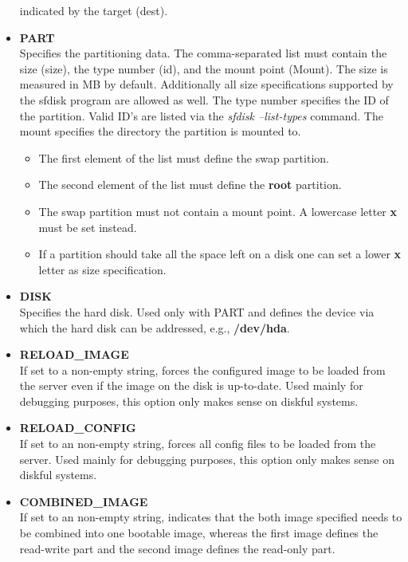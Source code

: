 \begin{itemize}
		indicated by the target (dest).
	\item \textbf{PART}\\
		Specifies the partitioning data. The comma-separated list
		must contain the size (size), the type number (id), and the
		mount point (Mount). The size is measured in MB by default.
		Additionally all size specifications supported by the sfdisk
		program are allowed as well. The type number specifies the ID
		of the partition. Valid ID's are listed via the
		\textit{sfdisk --list-types} command. The mount specifies the
		directory the partition is mounted to.
		\begin{itemize}
			\item The first element of the list must define the swap
                  partition.
            \item The second element of the list must define the
                  \textbf{root} partition.
	        \item The swap partition must not contain a mount point.
                  A lowercase letter \textbf{x} must be set instead.
            \item If a partition should take all the space left on
                  a disk one can set a lower \textbf{x} letter as
                  size specification.
		\end{itemize}
	\item \textbf{DISK}\\
		Specifies the hard disk. Used only with PART and defines
		the device via which the hard disk can be addressed,
		e.g., \textbf{/dev/hda}.
	\item \textbf{RELOAD\_IMAGE}\\
		If set to a non-empty string, forces the configured
		image to be loaded from the server even if the image on
		the disk is up-to-date. Used mainly for debugging
		purposes, this option only makes sense on diskful
		systems.
	\item \textbf{RELOAD\_CONFIG}\\
		If set to an non-empty string, forces all config files
		to be loaded from the server. Used mainly for debugging
		purposes, this option only makes sense on diskful
		systems.
	\item \textbf{COMBINED\_IMAGE}\\
        If set to an non-empty string, indicates that the both
        image specified needs to be combined into one bootable
        image, whereas the first image defines the read-write
        part and the second image defines the read-only part.
\end{itemize}

